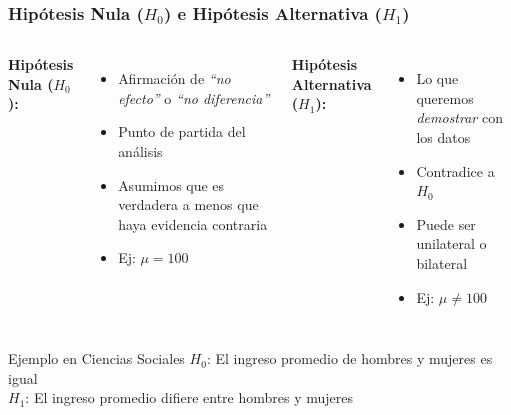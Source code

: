 \documentclass[aspectratio=169,11pt]{beamer}
\begin{document}
\begin{frame}
  \frametitle{Hip\'otesis Nula ($H_0$) e Hip\'otesis Alternativa ($H_1$)}
  \small
  \begin{columns}[T]
    \textbf{Hip\'otesis Nula ($H_0$):}
    \begin{itemize}
      \setlength{\itemsep}{3pt}
      \item Afirmaci\'on de \textit{``no efecto''} o \textit{``no diferencia''}
      \item Punto de partida del an\'alisis
      \item Asumimos que es verdadera a menos que haya evidencia contraria
      \item Ej: $\mu = 100$
    \end{itemize}

    \textbf{Hip\'otesis Alternativa ($H_1$):}
    \begin{itemize}
      \setlength{\itemsep}{3pt}
      \item Lo que queremos \textit{demostrar} con los datos
      \item Contradice a $H_0$
      \item Puede ser unilateral o bilateral
      \item Ej: $\mu \neq 100$
    \end{itemize}
  \end{columns}

  \vspace{0.4cm}
  \begin{exampleblock}{Ejemplo en Ciencias Sociales}
    $H_0$: El ingreso promedio de hombres y mujeres es igual \\
    $H_1$: El ingreso promedio difiere entre hombres y mujeres
  \end{exampleblock}
\end{frame}
\end{document}
